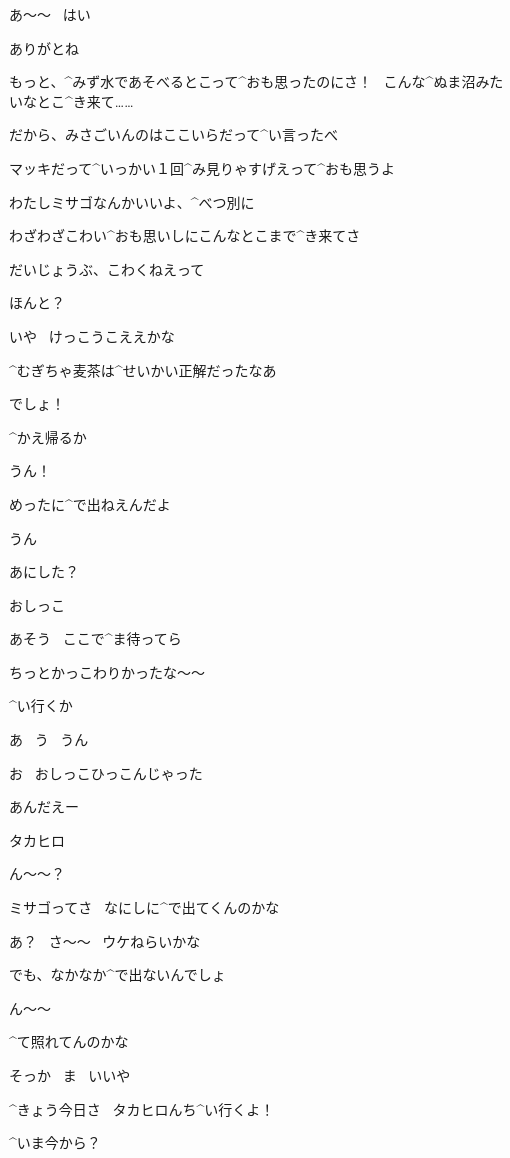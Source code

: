 \Takahiro あ〜〜
\ はい

\Takahiro ありがとね

\Makki もっと、^{みず}{水}であそべるとこって^{おも}{思}ったのにさ！
\ こんな^{ぬま}{沼}みたいなとこ^{き}{来}て……

\page
\Takahiro だから、みさごいんのはここいらだって^{い}{言}ったべ

\Takahiro マッキだって^{いっかい}{１回}^{み}{見}りゃすげえって^{おも}{思}うよ

\Makki わたしミサゴなんかいいよ、^{べつ}{別}に

\Makki わざわざこわい^{おも}{思}いしにこんなとこまで^{き}{来}てさ

\Takahiro だいじょうぶ、こわくねえって

\Makki ほんと？

\Takahiro いや
\ けっこうこええかな

\page
\Takahiro ^{むぎちゃ}{麦茶}は^{せいかい}{正解}だったなあ

\Makki でしょ！

\page
\Takahiro ^{かえ}{帰}るか

\Makki うん！

\Takahiro めったに^{で}{出}ねえんだよ

\Makki うん

\page
\Takahiro あにした？

\Makki おしっこ

\Takahiro あそう
\ ここで^{ま}{待}ってら

\Makki ちっとかっこわりかったな〜〜

\page[111]
\Takahiro ^{い}{行}くか

\Makki あ
\ う
\ うん

\Makki お
\ おしっこひっこんじゃった

\Takahiro あんだえー

\page
\Makki タカヒロ

\Takahiro ん〜〜？

\Makki ミサゴってさ
\ なにしに^{で}{出}てくんのかな

\Takahiro あ？
\ さ〜〜
\ ウケねらいかな

\Makki でも、なかなか^{で}{出}ないんでしょ

\Takahiro ん〜〜

\Takahiro ^{て}{照}れてんのかな

\Makki そっか
\ ま
\ いいや

\page
\Makki ^{きょう}{今日}さ
\ タカヒロんち^{い}{行}くよ！

\Takahiro ^{いま}{今}から？


